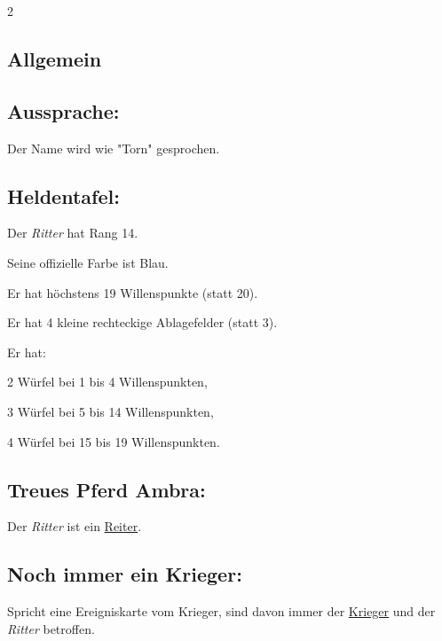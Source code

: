 \documentclass[10pt, a4paper, oneside]{book}
\newcommand{\fan}[1]{\textit{#1}}
\begin{document}
\begin{multicols*}{2}\raggedcolumns




\begin{nobgcolor}

\section{Allgemein}


\subsection{Aussprache:}


Der Name wird wie "Torn" gesprochen.
\supercite{33469}






\subsection{Heldentafel:}

Der \fan{Ritter} hat Rang 14.

Seine offizielle Farbe ist Blau.

Er hat höchstens 19 Willenspunkte (statt 20).

Er hat 4 kleine rechteckige Ablagefelder (statt 3).

Er hat:

\bullet{} 2 Würfel bei 1 bis 4 Willenspunkten,

\bullet{} 3 Würfel bei 5 bis 14 Willenspunkten,

\bullet{} 4 Würfel bei 15 bis 19 Willenspunkten.






\subsection{Treues Pferd Ambra:}

Der \fan{Ritter} ist ein \hyperref[reiter]{Reiter}.





\subsection{Noch immer ein Krieger:}

Spricht eine Ereigniskarte vom Krieger, sind davon immer der \hyperref[krieger]{Krieger} und der \fan{Ritter} betroffen.


\end{nobgcolor}
\end{multicols*}
\end{document}
